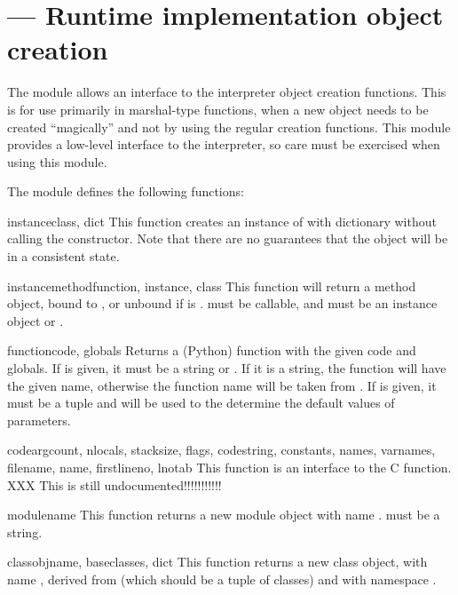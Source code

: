 \section{ ---
         Runtime implementation object creation}



The  module allows an interface to the interpreter object
creation functions. This is for use primarily in marshal-type functions,
when a new object needs to be created ``magically'' and not by using the
regular creation functions. This module provides a low-level interface
to the interpreter, so care must be exercised when using this module.

The  module defines the following functions:

\begin{funcdesc}{instance}{class, dict}
This function creates an instance of  with dictionary
 without calling the  constructor. Note that
there are no guarantees that the object will be in a consistent state.
\end{funcdesc}

\begin{funcdesc}{instancemethod}{function, instance, class}
This function will return a method object, bound to , or
unbound if  is .   must be
callable, and  must be an instance object or
.
\end{funcdesc}

\begin{funcdesc}{function}{code, globals}
Returns a (Python) function with the given code and globals. If
 is given, it must be a string or .  If it is a
string, the function will have the given name, otherwise the function
name will be taken from .  If
 is given, it must be a tuple and will be used to the
determine the default values of parameters.
\end{funcdesc}

\begin{funcdesc}{code}{argcount, nlocals, stacksize, flags, codestring,
                       constants, names, varnames, filename, name, firstlineno,
                       lnotab}
This function is an interface to the  C
function.
XXX This is still undocumented!!!!!!!!!!!
\end{funcdesc}

\begin{funcdesc}{module}{name}
This function returns a new module object with name .
 must be a string.
\end{funcdesc}

\begin{funcdesc}{classobj}{name, baseclasses, dict}
This function returns a new class object, with name , derived
from  (which should be a tuple of classes) and with
namespace .
\end{funcdesc}
